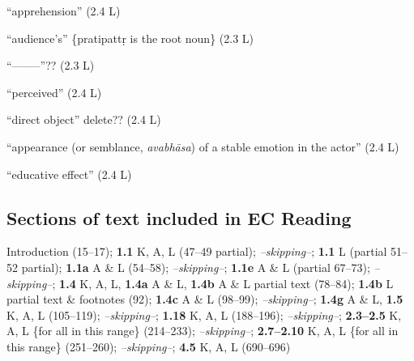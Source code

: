 \documentclass[10pt]{article}
\begin{document}
\begin{multicols}{2}
\begin{enumerate}[
			leftmargin=0em,
			rightmargin=0em,
		]
		 ``apprehension'' (2.4 L)

		 ``audience's'' \{pratipattṛ is the root noun\} (2.3 L)

		 ``--------''?? (2.3 L)

		 ``perceived'' (2.4 L)

		 ``direct object'' delete?? (2.4 L)

		 ``appearance (or semblance, \textit{avabhāsa}) of a stable emotion in the actor'' (2.4 L)

		 ``educative effect'' (2.4 L)


	\end{enumerate}
\end{multicols}


\subsection{Sections of text included in EC Reading}

{Introduction} (15--17);
\textbf{1.1} K, A, L (47--49 partial);
\textit{--skipping--};
\textbf{1.1} L (partial 51--52 partial);
\textbf{1.1a} A \& L (54--58);
\textit{--skipping--};
\textbf{1.1e} A \& L (partial 67--73);
\textit{--skipping--};
\textbf{1.4} K, A, L, \textbf{1.4a} A \& L, \textbf{1.4b} A \& L partial text (78--84);
\textbf{1.4b} L partial text \& footnotes (92);
\textbf{1.4c} A \& L (98--99);
\textit{--skipping--};
\textbf{1.4g} A \& L, \textbf{1.5} K, A, L (105--119);
\textit{--skipping--};
\textbf{1.18} K, A, L (188--196);
\textit{--skipping--};
\textbf{2.3--2.5} K, A, L \{for all in this range\} (214--233);
\textit{--skipping--};
\textbf{2.7--2.10} K, A, L \{for all in this range\} (251--260);
\textit{--skipping--};
\textbf{4.5} K, A, L (690--696)
\end{document}
